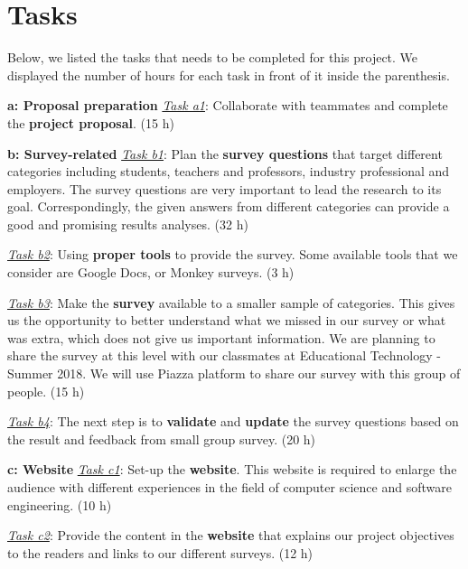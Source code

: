 \documentclass{sigchi}
\begin{document}
   
  \section{Tasks}
  Below, we listed the tasks that needs to be completed for this project. We displayed the number of hours for each task in front of it inside the parenthesis.\newline

\textbf{a: Proposal preparation}\newline
\textit{\underline{Task a1}}: Collaborate with teammates and complete the \textbf{project proposal}. (15 h)\newline

\textbf{b: Survey-related}\newline
\textit{\underline{Task b1}}: Plan the \textbf{survey questions} that target different categories including students, teachers and professors, industry professional and employers. The survey questions are very important to lead the research to its goal. Correspondingly, the given answers from different categories can provide a good and promising results analyses. (32 h)

\textit{\underline{Task b2}}: Using \textbf{proper tools} to provide the survey. Some available tools that we consider are Google Docs, or Monkey surveys. (3 h)

\textit{\underline{Task b3}}: Make the \textbf{survey} available to a smaller sample of categories. This gives us the opportunity to better understand what we missed in our survey or what was extra, which does not give us important information. We are planning to share the survey at this level with our classmates at Educational Technology - Summer 2018. We will use Piazza platform to share our survey with this group of people. (15 h)

\textit{\underline{Task b4}}: The next step is to \textbf{validate} and \textbf{update} the survey questions based on the result and feedback from small group survey. (20 h)\newline

\textbf{c: Website}\newline
\textit{\underline{Task c1}}: Set-up the \textbf{website}. This website is required to enlarge the audience with different  experiences in the field of computer science and software engineering. (10 h)

\textit{\underline{Task c2}}: Provide the content in the \textbf{website} that explains our project objectives to the readers and links to our different surveys. (12 h)
\end{document}
